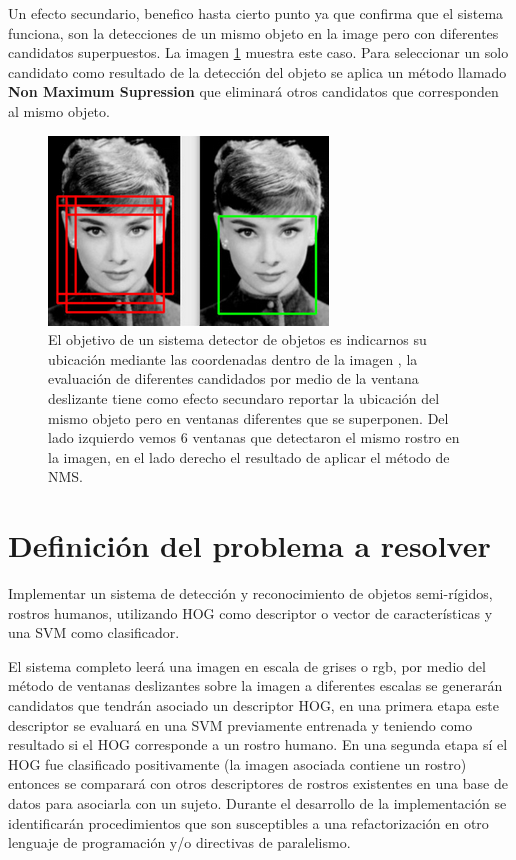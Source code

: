 \documentclass{article}
\begin{document}
Un efecto secundario, benefico hasta cierto punto ya que confirma que el sistema funciona, son la detecciones de un mismo objeto en la image pero con diferentes candidatos superpuestos. La imagen \ref{fig:nms} muestra este caso. Para seleccionar un solo candidato como resultado de la detección del objeto se aplica un método llamado  \textbf{Non Maximum Supression} que eliminará otros candidatos que corresponden al mismo objeto.
\begin{figure}[ht]
\centering
\includegraphics[width=.5\textwidth]{NMS.png}
\caption{El objetivo de un sistema detector de objetos es indicarnos su ubicación mediante las coordenadas dentro de la imagen , la evaluación de diferentes candidados por medio de la ventana deslizante tiene como efecto secundaro reportar la ubicación del mismo objeto pero en ventanas diferentes que se superponen. Del lado izquierdo vemos 6 ventanas que detectaron el mismo rostro en la imagen, en el lado derecho el resultado de aplicar el método de NMS. }
\label{fig:nms}
\end{figure}

\section*{Definición del problema a resolver}
Implementar un sistema de detección y reconocimiento  de objetos semi-rígidos, rostros humanos, utilizando HOG como descriptor o vector de características y una SVM como clasificador. 

El sistema completo leerá una imagen en escala de grises o rgb, por medio del método de ventanas deslizantes sobre la imagen a diferentes escalas se generarán candidatos que tendrán asociado un descriptor HOG, en una primera etapa este descriptor se evaluará en una SVM previamente entrenada y teniendo como resultado si el HOG corresponde a un rostro humano.  En una segunda etapa sí el HOG fue clasificado positivamente (la imagen asociada contiene un rostro) entonces se comparará con otros descriptores de rostros existentes en una base de datos para asociarla con un sujeto. Durante el desarrollo de la implementación se identificarán procedimientos que son susceptibles a una refactorización en otro lenguaje de programación  y/o  directivas de paralelismo.
\end{document}
